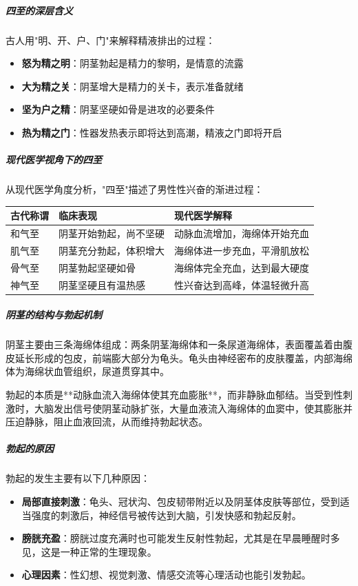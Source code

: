 \subparagraph{四至的深层含义}

古人用"明、开、户、门"来解释精液排出的过程：
\begin{itemize}
    \item \textbf{怒为精之明}：阴茎勃起是精力的黎明，是情意的流露
    \item \textbf{大为精之关}：阴茎增大是精力的关卡，表示准备就绪
    \item \textbf{坚为户之精}：阴茎坚硬如骨是进攻的必要条件
    \item \textbf{热为精之门}：性器发热表示即将达到高潮，精液之门即将开启
\end{itemize}

\subparagraph{现代医学视角下的四至}

从现代医学角度分析，"四至"描述了男性性兴奋的渐进过程：

\begin{center}
\begin{tabular}{p{3cm} p{5cm} p{4cm}}
\toprule
\textbf{古代称谓} & \textbf{临床表现} & \textbf{现代医学解释} \\
\midrule
和气至 & 阴茎开始勃起，尚不坚硬 & 动脉血流增加，海绵体开始充血 \\
肌气至 & 阴茎充分勃起，体积增大 & 海绵体进一步充血，平滑肌放松 \\
骨气至 & 阴茎勃起坚硬如骨 & 海绵体完全充血，达到最大硬度 \\
神气至 & 阴茎坚硬且有温热感 & 性兴奋达到高峰，体温轻微升高 \\
\bottomrule
\end{tabular}
\end{center}

\subparagraph{阴茎的结构与勃起机制}

阴茎主要由三条海绵体组成：两条阴茎海绵体和一条尿道海绵体，表面覆盖着由腹皮延长形成的包皮，前端膨大部分为龟头。龟头由神经密布的皮肤覆盖，内部海绵体为海绵状血管组织，尿道贯穿其中。

勃起的本质是**动脉血流入海绵体使其充血膨胀**，而非静脉血郁结。当受到性刺激时，大脑发出信号使阴茎动脉扩张，大量血液流入海绵体的血窦中，使其膨胀并压迫静脉，阻止血液回流，从而维持勃起状态。

\subparagraph{勃起的原因}

勃起的发生主要有以下几种原因：
\begin{itemize}
    \item \textbf{局部直接刺激}：龟头、冠状沟、包皮韧带附近以及阴茎体皮肤等部位，受到适当强度的刺激后，神经信号被传达到大脑，引发快感和勃起反射。
    \item \textbf{膀胱充盈}：膀胱过度充满时也可能发生反射性勃起，尤其是在早晨睡醒时多见，这是一种正常的生理现象。
    \item \textbf{心理因素}：性幻想、视觉刺激、情感交流等心理活动也能引发勃起。
\end{itemize}

